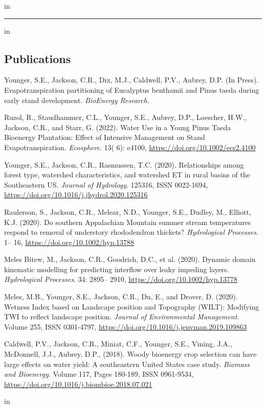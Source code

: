 \documentclass[10pt,letterpaper]{article}
\begin{document}
	\vspace{-0.4em}
	 in
	
	\hrule
	\vspace{-0.4em}
	 in
	\subsection*{Publications}
	
	\begin{hangparas}{.25in}{1}
		
		Younger, S.E., Jackson, C.R., Dix, M.J., Caldwell, P.V., Aubrey, D.P. (In Press). Evapotranspiration partitioning of Eucalyptus benthamii and Pinus taeda during early stand development. \textit{BioEnergy Research}.
		
		Ruzol, R., Staudhammer, C.L., Younger, S.E., Aubrey, D.P., Loescher, H.W., Jackson, C.R., and Starr, G. (2022). Water Use in a Young Pinus Taeda Bioenergy Plantation: Effect of Intensive Management on Stand Evapotranspiration. \textit{Ecosphere}. 13( 6): e4100, \url{https://doi.org/10.1002/ecs2.4100}
		
		Younger, S.E., Jackson, C.R., Rasmussen, T.C. (2020). Relationships among forest type, watershed characteristics, and watershed ET in rural basins of the Southeastern US.
		\textit{Journal of Hydrology}. 125316, ISSN 0022-1694, \url{https://doi.org/10.1016/j.jhydrol.2020.125316}
		
		Raulerson, S., Jackson, C.R., Melear, N.D., Younger, S.E., Dudley, M., Elliott, K.J. (2020). Do southern Appalachian Mountain summer stream temperatures respond to removal of understory rhododendron thickets? \textit{Hydrological Processes}. 1– 16, \url{https://doi.org/10.1002/hyp.13788}
		
		Meles Bitew, M., Jackson, C.R., Goodrich, D.C., et al. (2020). Dynamic domain kinematic modelling for predicting interflow over leaky impeding layers. \textit{Hydrological Processes}. 34: 2895– 2910, \url{https://doi.org/10.1002/hyp.13778}
		
		Meles, M.B., Younger, S.E., Jackson, C.R., Du, E., and Drover, D. (2020). Wetness Index based on Landscape position and Topography (WILT): Modifying TWI to reflect landscape position. \textit{Journal of Environmental Management}. Volume 255, ISSN 0301-4797, \url{https://doi.org/10.1016/j.jenvman.2019.109863}
		
		Caldwell, P.V., Jackson, C.R., Miniat, C.F., Younger, S.E., Vining, J.A., McDonnell, J.J., Aubrey, D.P., (2018). Woody bioenergy crop selection can have large effects on water yield: A southeastern United States case study.
		\textit{Biomass and Bioenergy}. Volume 117, Pages 180-189, ISSN 0961-9534, \url{https://doi.org/10.1016/j.biombioe.2018.07.021}
		
		 in
		\vspace{-0.4em}
		
	\end{hangparas}
	
\end{document}
